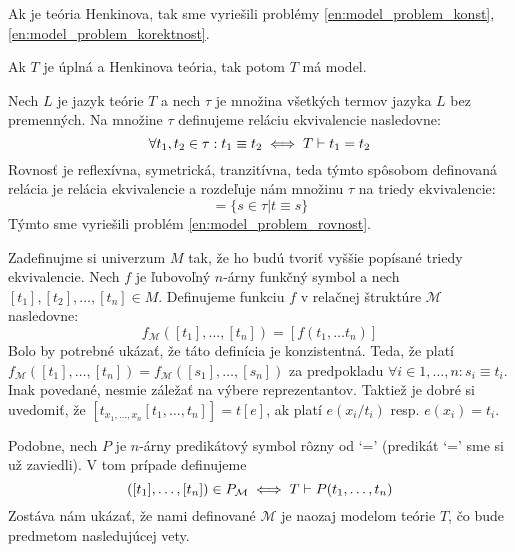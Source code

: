 \begin{poznamka}
    Ak je teória Henkinova, tak sme vyriešili problémy
    \ref{en:model_problem_konst}, \ref{en:model_problem_korektnost}.
\end{poznamka}

\begin{lema}
    Ak $T$ je úplná a Henkinova teória, tak potom $T$ má model.
    \label{lema:uplna_henkinova}
\end{lema}
\begin{dokaz}
    Nech $L$ je jazyk teórie $T$ a nech $\tau$ je množina všetkých
    termov jazyka $L$ bez premenných. Na množine $\tau$ definujeme reláciu
    ekvivalencie nasledovne:
    \begin{equation*}
        \forall t_1, t_2 \in \tau :
            t_1 \equiv t_2 \iff T \vdash t_1 = t_2
    \end{equation*}
    Rovnosť je reflexívna, symetrická, tranzitívna, teda týmto
    spôsobom definovaná relácia je relácia ekvivalencie a rozdeľuje
    nám množinu $\tau$ na triedy ekvivalencie:
    \begin{equation*}
        [t] = \{ s \in \tau | t \equiv s\}
    \end{equation*}
    Týmto sme vyriešili problém \ref{en:model_problem_rovnost}.

    Zadefinujme si univerzum $M$ tak, že ho budú tvoriť vyššie popísané
    triedy ekvivalencie.
    Nech $f$ je ľubovoľný $n$-árny funkčný symbol a nech
    $[t_1], [t_2], \ldots, [t_n] \in M$. Definujeme funkciu $f$ v relačnej
    štruktúre $\mathcal{M}$ nasledovne:
    \begin{equation*}
        f_\mathcal{M}([t_1], \dots, [t_n]) = [f(t_1, \dots t_n)]
    \end{equation*}
    Bolo by potrebné ukázať, že táto definícia je konzistentná. Teda,
    že platí
    $f_\mathcal{M}([t_1], \dots, [t_n])=f_\mathcal{M}([s_1], \dots, [s_n])$
    za predpokladu $\forall i \in {1,\dots,n}:s_i \equiv t_i$.
    Inak povedané, nesmie záležať na výbere reprezentantov.
    Taktiež je dobré si uvedomiť, že
    $[t_{x_1,\dots,x_n}[t_1,\dots,t_n]]=t[e]$, ak platí $e(x_i/t_i)$ resp.
    $e(x_i)=t_i$.

    Podobne, nech $P$ je $n$-árny predikátový symbol rôzny od `='
    (predikát `=' sme si už zaviedli). V tom prípade definujeme
    \begin{equation*}
     ([t_1], \dots, [t_n]) \in P_\mathcal{M} \iff
        T \vdash P(t_1, \dots, t_n)
    \end{equation*}
    Zostáva nám ukázať, že nami definované $\mathcal{M}$ je
    naozaj modelom teórie $T$, čo bude predmetom nasledujúcej vety.
    \\
\end{dokaz}

